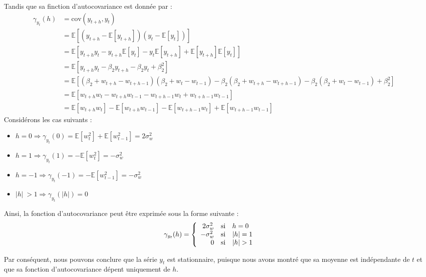 \documentclass{homework}
\begin{document}
Tandis que sa finction d'autocovariance est donnée par :
\begin{align*}
\gamma_{y_t}(h) &= \text{cov}(y_{t+h}, y_t) \\
          &= \mathbb{E}[(y_{t+h} - \mathbb{E}[y_{t+h}])(y_t - \mathbb{E}[y_t])] \\
          &= \mathbb{E}[y_{t+h} y_t - y_{t+h} \mathbb{E}[y_t] - y_t \mathbb{E}[y_{t+h}] + \mathbb{E}[y_{t+h}] \mathbb{E}[y_{t}]] \\ 
          & = \mathbb{E}[y_{t+h} y_t - \beta_2 y_{t+h} - \beta_2 y_t + \beta^2_2] \\
          &= \mathbb{E}[(\beta_2 + w_{t+h} - w_{t+h-1})(\beta_2 + w_t - w_{t-1}) - \beta_2(\beta_2 + w_{t+h} - w_{t+h-1}) - \beta_2(\beta_2 + w_t - w_{t-1}) + \beta_2^2] \\
          &= \mathbb{E}[w_{t+h}w_t - w_{t+h}w_{t-1} - w_{t+h-1}w_t + w_{t+h-1}w_{t-1}] \\
          &= \mathbb{E}[w_{t+h}w_t] - \mathbb{E}[w_{t+h}w_{t-1}] - \mathbb{E}[w_{t+h-1}w_t] + \mathbb{E}[w_{t+h-1}w_{t-1}]
\end{align*}
Considérons les cas suivants :
\begin{itemize}
    \item[\textbullet] $h = 0 \Rightarrow \gamma_{y_t}(0) = \mathbb{E}[w_t^2] + \mathbb{E}[w_{t-1}^2]  = 2\sigma^2_w$
    \item[\textbullet] $h = 1 \Rightarrow \gamma_{y_t}(1) = -\mathbb{E}[w_t^2] = -\sigma_w^2$
    \item[\textbullet] $h = -1 \Rightarrow \gamma_{y_t}(-1) = -\mathbb{E}[w_{t-1}^2] = -\sigma_w^2$
    \item[\textbullet] $\vert h \vert \ > 1 \Rightarrow \gamma_{y_t} (\vert h \vert) = 0$
\end{itemize}
Ainsi, la fonction d'autocovariance peut être exprimée sous la forme suivante :
\begin{align*}
\gamma_{y_t}(h) &= \left\{
                \begin{array}{r c l}
                    2\sigma_w^2 &\text{si}& h = 0\\
                    -\sigma_w^2 &\text{si}& \vert h \vert = 1\\
                    0           &\text{si}& \vert h \vert > 1
                \end{array}
             \right.
\end{align*}

Par conséquent, nous pouvons conclure que la série $y_t$ est stationnaire, puisque nous avons montré que sa moyenne est indépendante de $t$ et que sa fonction d'autocovariance dépent uniquement de $h$.
\end{document}
